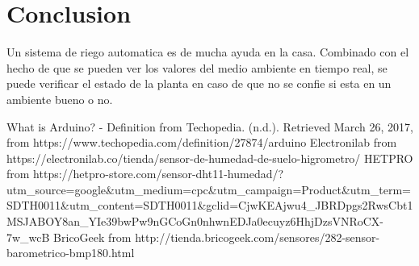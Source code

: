 \documentclass{article}
\begin{document}
\newpage
\section{Conclusion}
Un sistema de riego automatica es de mucha ayuda en la casa. Combinado con el hecho de que se pueden ver los valores del medio ambiente en tiempo real, se puede verificar el estado de la planta en caso de que no se confie si esta en un ambiente bueno o no.

\renewcommand\refname{Referencias}
\begin{thebibliography}{1}
	 What is Arduino? - Definition from Techopedia. (n.d.). Retrieved March 26, 2017, from https://www.techopedia.com/definition/27874/arduino
	 Electronilab from https://electronilab.co/tienda/sensor-de-humedad-de-suelo-higrometro/
	 HETPRO from https://hetpro-store.com/sensor-dht11-humedad/?utm\_source=google\&utm\_medium=cpc\&utm\_campaign=Product\&utm\_term=SDTH0011\&utm\_content=SDTH0011\&gclid=CjwKEAjwu4\_JBRDpgs2RwsCbt1MSJABOY8an\_YIe39bwPw9nGCoGn0nhwnEDJa0ecuyz6HhjDzsVNRoCX-7w\_wcB
	 BricoGeek from http://tienda.bricogeek.com/sensores/282-sensor-barometrico-bmp180.html
\end{thebibliography}
\end{document}
